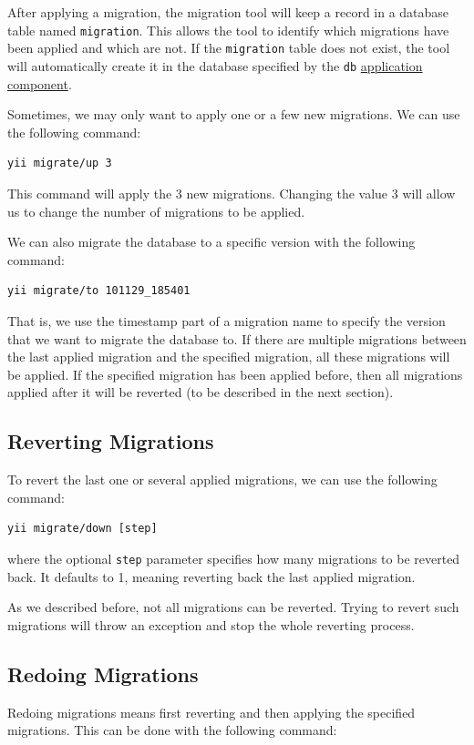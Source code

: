 After applying a migration, the migration tool will keep a record in a database
table named \lstinline|migration|. This allows the tool to identify which migrations
have been applied and which are not. If the \lstinline|migration| table does not exist,
the tool will automatically create it in the database specified by the \lstinline|db|
\hyperref[structure-application-components.md]{application component}.

Sometimes, we may only want to apply one or a few new migrations. We can use the
following command:

\begin{lstlisting}
yii migrate/up 3
\end{lstlisting}
This command will apply the 3 new migrations. Changing the value 3 will allow
us to change the number of migrations to be applied.

We can also migrate the database to a specific version with the following command:

\begin{lstlisting}
yii migrate/to 101129_185401
\end{lstlisting}
That is, we use the timestamp part of a migration name to specify the version
that we want to migrate the database to. If there are multiple migrations between
the last applied migration and the specified migration, all these migrations
will be applied. If the specified migration has been applied before, then all
migrations applied after it will be reverted (to be described in the next section).

\subsection{Reverting Migrations}
To revert the last one or several applied migrations, we can use the following
command:

\begin{lstlisting}
yii migrate/down [step]
\end{lstlisting}
where the optional \lstinline|step| parameter specifies how many migrations to be reverted
back. It defaults to 1, meaning reverting back the last applied migration.

As we described before, not all migrations can be reverted. Trying to revert
such migrations will throw an exception and stop the whole reverting process.

\subsection{Redoing Migrations}
Redoing migrations means first reverting and then applying the specified migrations.
This can be done with the following command:

